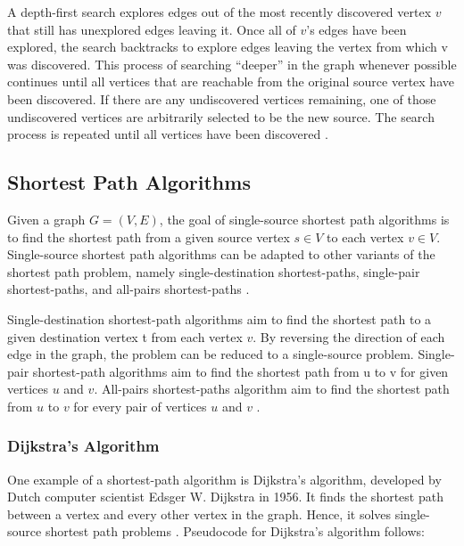 \documentclass[10pt,11pt,12pt,oneside]{book}
\begin{document}
	A depth-first search explores edges out of the most recently discovered vertex $v$ that still has unexplored edges leaving it. Once all of $v$’s edges have been explored, the search backtracks to explore edges leaving the vertex from which v was discovered. This process of searching “deeper” in the graph whenever possible continues until all vertices that are reachable from the original source vertex have been discovered. If there are any undiscovered vertices remaining, one of those undiscovered vertices are arbitrarily selected to be the new source. The search process is repeated until all vertices have been discovered \cite{beel2016paper}. 
	
	\subsection{Shortest Path Algorithms}
	Given a graph $G = (V, E)$, the goal of single-source shortest path algorithms is to find the shortest path from a given source vertex $s \in V$  to each vertex $v \in V$.  Single-source shortest path algorithms can be adapted to other variants of the shortest path problem, namely single-destination shortest-paths, single-pair shortest-paths, and all-pairs shortest-paths \cite{beel2016paper}.
	
	Single-destination shortest-path algorithms aim to find the shortest path to a given destination vertex t from each vertex $v$. By reversing the direction of each edge in the graph, the problem can be reduced to a single-source problem. Single-pair shortest-path algorithms aim to find the shortest path from u to v for given vertices $u$ and $v$. All-pairs shortest-paths algorithm aim to find the shortest path from $u$ to $v$ for every pair of vertices $u$ and $v$ \cite{beel2016paper}. 
	
	\subsubsection{Dijkstra's Algorithm}
	One example of a shortest-path algorithm is Dijkstra’s algorithm, developed by Dutch computer scientist Edsger W. Dijkstra in 1956. It finds the shortest path between a vertex and every other vertex in the graph. Hence, it solves single-source shortest path problems \cite{cormen_leiserson_rivest_stein_2009}. 
	Pseudocode for Dijkstra’s algorithm follows:\\
	
\end{document}
